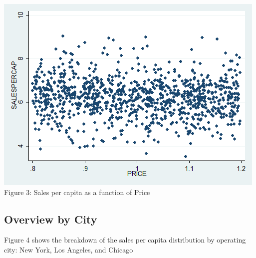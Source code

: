 \documentclass[10pt]{article}
\begin{document}
\begin{center}
  \includegraphics[scale=0.4]{g5.png}\\
Figure 3: Sales per capita as a function of Price
\end{center}


\subsection{Overview by City}

Figure 4 shows the breakdown of the sales per capita distribution by operating city: New York, Los Angeles, and Chicago
\end{document}
